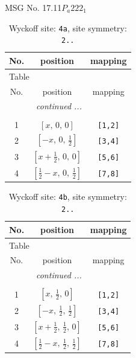 \documentclass[fleqn,8pt]{jsarticle}
\begin{document}
\setcounter{MaxMatrixCols}{32}

\renewcommand{\tablename}{Table~}
\renewcommand{\figurename}{Figure~}
\begin{center}
\LARGE
MSG No. 17.11\quad$P_{a}222_{1}$
\end{center}
\renewcommand{\arraystretch}{1.2}
\begin{longtable}{ccc}
\caption{Wyckoff site: {\tt 4a}, site symmetry: {\tt 2..}}
 \\
 \hline \hline
No. & position & mapping \\ \hline \endfirsthead

\multicolumn{2}{l}{\tablename\ \thetable{}} \\
 \hline \hline
No. & position & mapping \\ \hline \endhead

 \hline \hline
\multicolumn{2}{r}{\footnotesize\it continued ...} \\ \endfoot

 \hline \hline
\multicolumn{2}{r}{} \\ \endlastfoot

1 & $\left[ x,\, 0,\, 0 \right]$ & {\tt [1,2]} \\ \hline
2 & $\left[ - x,\, 0,\, \frac{1}{2} \right]$ & {\tt [3,4]} \\ \hline
3 & $\left[ x + \frac{1}{2},\, 0,\, 0 \right]$ & {\tt [5,6]} \\ \hline
4 & $\left[ \frac{1}{2} - x,\, 0,\, \frac{1}{2} \right]$ & {\tt [7,8]} \\
\end{longtable}
\renewcommand{\arraystretch}{1.2}
\begin{longtable}{ccc}
\caption{Wyckoff site: {\tt 4b}, site symmetry: {\tt 2..}}
 \\
 \hline \hline
No. & position & mapping \\ \hline \endfirsthead

\multicolumn{2}{l}{\tablename\ \thetable{}} \\
 \hline \hline
No. & position & mapping \\ \hline \endhead

 \hline \hline
\multicolumn{2}{r}{\footnotesize\it continued ...} \\ \endfoot

 \hline \hline
\multicolumn{2}{r}{} \\ \endlastfoot

1 & $\left[ x,\, \frac{1}{2},\, 0 \right]$ & {\tt [1,2]} \\ \hline
2 & $\left[ - x,\, \frac{1}{2},\, \frac{1}{2} \right]$ & {\tt [3,4]} \\ \hline
3 & $\left[ x + \frac{1}{2},\, \frac{1}{2},\, 0 \right]$ & {\tt [5,6]} \\ \hline
4 & $\left[ \frac{1}{2} - x,\, \frac{1}{2},\, \frac{1}{2} \right]$ & {\tt [7,8]} \\
\end{longtable}
\end{document}
